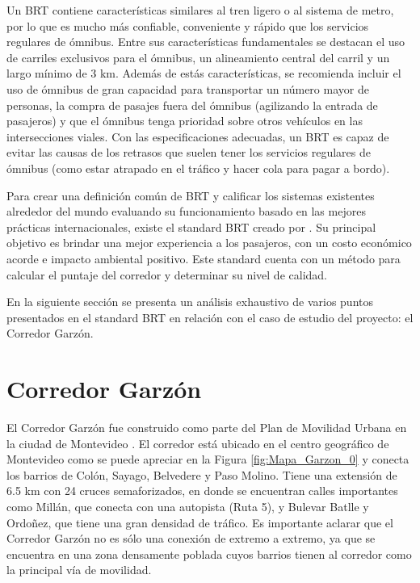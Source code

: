 Un BRT contiene características similares al tren ligero o al sistema de metro, por lo que es mucho más confiable, conveniente y rápido que los servicios regulares de ómnibus. Entre sus características fundamentales se destacan el uso de carriles exclusivos para el ómnibus, un alineamiento central del carril y un largo mínimo de 3 km. Además de estás características, se recomienda incluir el uso de ómnibus de gran capacidad para transportar un número mayor de personas, la compra de pasajes fuera del ómnibus (agilizando la entrada de pasajeros) y que el ómnibus tenga prioridad sobre otros vehículos en las intersecciones viales. Con las especificaciones adecuadas, un BRT es capaz de evitar las causas de los retrasos que suelen tener los servicios regulares de ómnibus (como estar atrapado en el tráfico y hacer cola para pagar a bordo). 

Para crear una definición común de BRT y calificar los sistemas existentes alrededor del mundo evaluando su funcionamiento basado en las mejores prácticas internacionales, existe el standard BRT creado por \citet{brt_standar}. Su principal objetivo es brindar una mejor experiencia a los pasajeros, con un costo económico acorde e impacto ambiental positivo. Este standard cuenta con un método para calcular el puntaje del corredor y determinar su nivel de calidad. 

En la siguiente sección se presenta un análisis exhaustivo de varios puntos presentados en el standard BRT en relación con el caso de estudio del proyecto: el Corredor Garzón.

	
\section{Corredor Garzón}	


El Corredor Garzón fue construido como parte del Plan de Movilidad Urbana en la ciudad de Montevideo \citep{PlanMovilidad}. El corredor está ubicado en el centro geográfico de Montevideo como se puede apreciar en la Figura \ref{fig:Mapa_Garzon_0} y conecta los barrios de Colón, Sayago, Belvedere y Paso Molino. Tiene una extensión de 6.5 km con 24 cruces semaforizados, en donde se encuentran calles importantes como Millán, que conecta con una autopista (Ruta 5), y Bulevar Batlle y Ordoñez, que tiene una gran densidad de tráfico. Es importante aclarar que el Corredor Garzón no es sólo una conexión de extremo a extremo, ya que se encuentra en una zona densamente poblada cuyos barrios tienen al corredor como la principal vía de movilidad.

